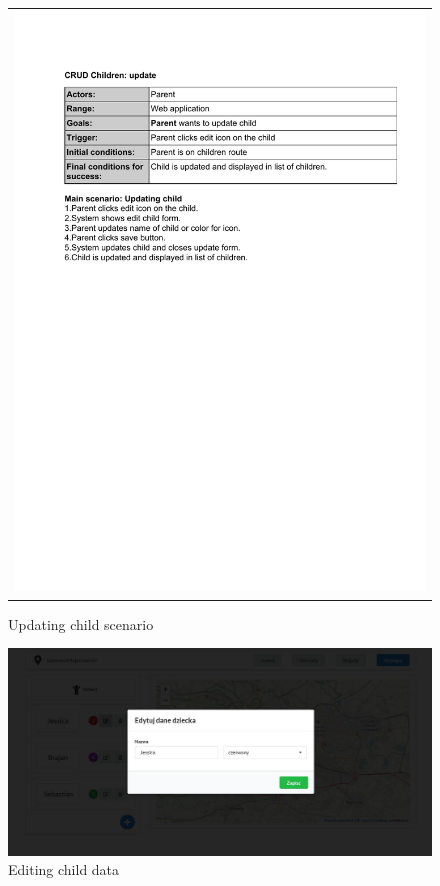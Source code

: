 \documentclass{sprawozdanie-agh}
\begin{document}
    	\begin{figure}[H]
    		\centering
    		\begin{tabular}{c}
    			\includegraphics[width=.80\textwidth]{upC_cropped}
    		\end{tabular}
    		\caption{Updating child scenario}
    	\end{figure}

    	\begin{figure}[H]
    		\centering
    		\includegraphics[width=.80\textwidth]{editChild}
    		\caption{Editing child data}
    	\end{figure}
\end{document}
